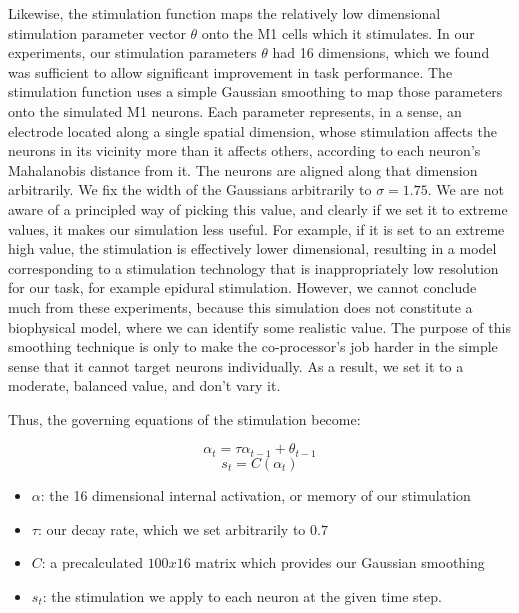 \documentclass[12pt]{iopart}
\begin{document}
Likewise, the stimulation function maps the relatively low dimensional stimulation
parameter vector $\theta$ onto the M1 cells which it stimulates. In our experiments,
our stimulation parameters $\theta$ had 16 dimensions, which we found was
sufficient to allow significant improvement in task performance. The stimulation
function uses a simple Gaussian smoothing to map those parameters onto the simulated
M1 neurons. Each parameter represents, in a sense, an electrode located along a single
spatial dimension, whose stimulation affects the neurons in its vicinity more than
it affects others, according to each neuron's Mahalanobis distance from it. The neurons
are aligned along that dimension arbitrarily. We fix the width of the Gaussians
arbitrarily to $\sigma=1.75$. We are not aware of a principled way of picking this
value, and clearly if we set it to extreme values, it makes our simulation less useful.
For example, if it is set to an extreme high value, the stimulation is effectively
lower dimensional, resulting in a model corresponding to a stimulation technology that
is inappropriately low resolution for our task, for example epidural stimulation.
However, we cannot conclude much from these experiments, because this simulation does
not constitute a biophysical model, where we can identify some realistic value. The
purpose of this smoothing technique is only to make the co-processor's job harder in
the simple sense that it cannot target neurons individually.
As a result, we set it to a moderate, balanced value, and don't vary it.

Thus, the governing equations of the stimulation become:

\begin{equation}
\alpha_{t} = \tau\alpha_{t-1} + \theta_{t-1}
\end{equation}
\begin{equation}
s_{t} = C(\alpha_{t})
\end{equation}

\begin{itemize}
	\item $\alpha$: the 16 dimensional internal activation, or memory
        of our stimulation
	\item $\tau$: our decay rate, which we set arbitrarily to $0.7$
	\item $C$: a precalculated $100 x 16$ matrix which provides our
	Gaussian smoothing
	\item $s_{t}$: the stimulation we apply to each neuron at the
	given time step.
\end{itemize}
\end{document}

